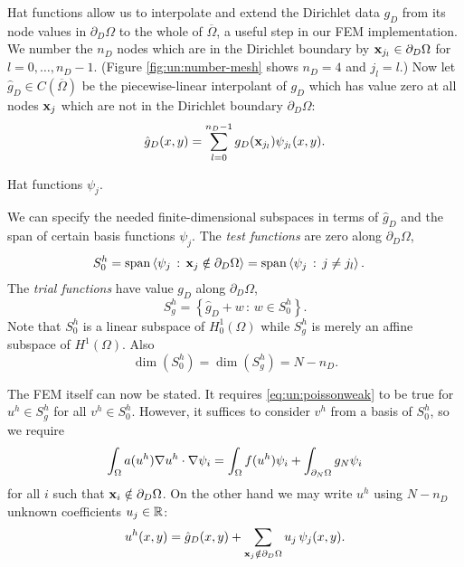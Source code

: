 Hat functions allow us to interpolate and extend the Dirichlet data $g_D$ from its node values in $\partial_D \Omega$ to the whole of $\overline\Omega$, a useful step in our FEM implementation.  We number the $n_D$ nodes which are in the Dirichlet boundary by $\mathbf{x}_{j_l} \in \partial_D\Omega$ for $l=0,\dots,n_D-1$.  (Figure \ref{fig:un:number-mesh} shows $n_D=4$ and $j_l=l$.)  Now let $\hat g_D \in C(\overline\Omega)$ be the piecewise-linear interpolant of $g_D$ which has value zero at all nodes $\mathbf{x}_j$ which are not in the Dirichlet boundary $\partial_D \Omega$:
\begin{equation}
\hat g_D(x,y) = \sum_{l=0}^{n_D-1} g_D(\mathbf{x}_{j_l}) \psi_{j_l}(x,y). \label{eq:un:hatgdefine}
\end{equation}

\begin{marginfigure}

\caption{Hat functions $\psi_j$.}
\label{fig:un:hatfunction}
\end{marginfigure}

We can specify the needed finite-dimensional subspaces in terms of $\hat g_D$ and the span of certain basis functions $\psi_j$.  The \emph{test functions} are zero along $\partial_D \Omega$,
\begin{align*}
S_{0}^h &= \operatorname{span}\left<\psi_j \,:\, \mathbf{x}_j \notin \partial_D \Omega\right> = \operatorname{span}\left<\psi_j \,:\, j \neq j_l\right>.
\end{align*}
The \emph{trial functions} have value $g_D$ along $\partial_D \Omega$,
\begin{equation}
S_{g}^h = \left\{\hat g_D + w \,:\, w \in S_{0}^h\right\}.
\end{equation}
Note that $S_{0}^h$ is a linear subspace of $H_{0}^1(\Omega)$ while $S_{g}^h$ is merely an affine subspace of $H^1(\Omega)$.  Also
\begin{equation}
\dim(S_{0}^h)=\dim(S_{g}^h)=N-n_D.
\end{equation}

The FEM itself can now be stated.  It requires \eqref{eq:un:poissonweak} to be true for $u^h\in S_{g}^h$ for all $v^h\in S_{0}^h$.  However, it suffices to consider $v^h$ from a basis of $S_{0}^h$, so we require
\begin{equation}
\int_\Omega a(u^h) \nabla u^h \cdot \nabla \psi_i = \int_\Omega f(u^h) \psi_i + \int_{\partial_N\Omega} g_N \psi_i \label{eq:un:weakformhat}
\end{equation}
for all $i$ such that $\mathbf{x}_i \notin \partial_D \Omega$.  On the other hand we may write $u^h$ using $N-n_D$ unknown coefficients $u_j\in\mathbb{R}$:
\begin{equation}
u^h(x,y) = \hat g_D(x,y) + \sum_{\mathbf{x}_j \notin \partial_D \Omega} u_j\, \psi_j(x,y). \label{eq:un:uhexpand}
\end{equation}

